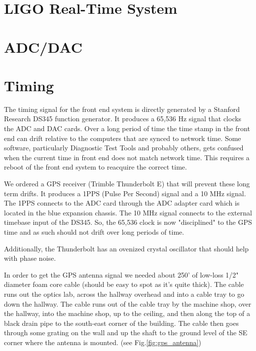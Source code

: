 \section{LIGO Real-Time System}

\section{ADC/DAC}

\section{Timing}

The timing signal for the front end system is directly generated by a Stanford Research DS345 function generator. It produces a 65,536 Hz signal that clocks the ADC and DAC cards. Over a long period of time the time stamp in the front end can drift relative to the computers that are synced to network time. Some software, particularly Diagnostic Test Tools and probably others, gets confused when the current time in front end does not match network time. This requires a reboot of the front end system to reacquire the correct time.

We ordered a GPS receiver (Trimble Thunderbolt E) that will prevent these long term drifts. It produces a 1PPS (Pulse Per Second) signal and a 10 MHz signal. The 1PPS connects to the ADC card through the ADC adapter card which is located in the blue expansion chassis. The 10 MHz signal connects to the external timebase input of the DS345. So, the 65,536 clock is now "disciplined" to the GPS time and as such should not drift over long periods of time.

Additionally, the Thunderbolt has an ovenized crystal oscillator that should help with phase noise.

In order to get the GPS antenna signal we needed about 250' of low-loss 1/2" diameter foam core cable (should be easy to spot as it's quite thick). The cable runs out the optics lab, across the hallway overhead and into a cable tray to go down the hallway. The cable runs out of the cable tray by the machine shop, over the hallway, into the machine shop, up to the ceiling, and then along the top of a black drain pipe to the south-east corner of the building. The cable then goes through some grating on the wall and up the shaft to the ground level of the SE corner where the antenna is mounted. (see Fig.\ref{fig:gps_antenna})

